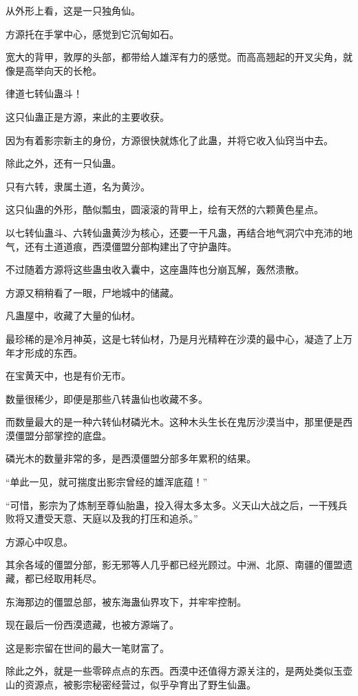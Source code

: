 
\begin{this_body}

从外形上看，这是一只独角仙。

方源托在手掌中心，感觉到它沉甸如石。

宽大的背甲，敦厚的头部，都带给人雄浑有力的感觉。而高高翘起的开叉尖角，就像是高举向天的长枪。

律道七转仙蛊斗！

这只仙蛊正是方源，来此的主要收获。

因为有着影宗新主的身份，方源很快就炼化了此蛊，并将它收入仙窍当中去。

除此之外，还有一只仙蛊。

只有六转，隶属土道，名为黄沙。

这只仙蛊的外形，酷似瓢虫，圆滚滚的背甲上，绘有天然的六颗黄色星点。

以七转仙蛊斗、六转仙蛊黄沙为核心，还要一干凡蛊，再结合地气洞穴中充沛的地气，还有土道道痕，西漠僵盟分部构建出了守护蛊阵。

不过随着方源将这些蛊虫收入囊中，这座蛊阵也分崩瓦解，轰然溃散。

方源又稍稍看了一眼，尸地城中的储藏。

凡蛊屋中，收藏了大量的仙材。

最珍稀的是冷月神英，这是七转仙材，乃是月光精粹在沙漠的最中心，凝造了上万年才形成的东西。

在宝黄天中，也是有价无市。

数量很稀少，即便是那些八转蛊仙也收藏不多。

而数量最大的是一种六转仙材磷光木。这种木头生长在鬼厉沙漠当中，那里便是西漠僵盟分部掌控的底盘。

磷光木的数量非常的多，是西漠僵盟分部多年累积的结果。

“单此一见，就可揣度出影宗曾经的雄浑底蕴！”

“可惜，影宗为了炼制至尊仙胎蛊，投入得太多太多。义天山大战之后，一干残兵败将又遭受天意、天庭以及我的打压和追杀。”

方源心中叹息。

其余各域的僵盟分部，影无邪等人几乎都已经光顾过。中洲、北原、南疆的僵盟遗藏，都已经取用耗尽。

东海那边的僵盟总部，被东海蛊仙界攻下，并牢牢控制。

现在最后一份西漠遗藏，也被方源端了。

这是影宗留在世间的最大一笔财富了。

除此之外，就是一些零碎点点的东西。西漠中还值得方源关注的，是两处类似玉壶山的资源点，被影宗秘密经营过，似乎孕育出了野生仙蛊。


\end{this_body}
